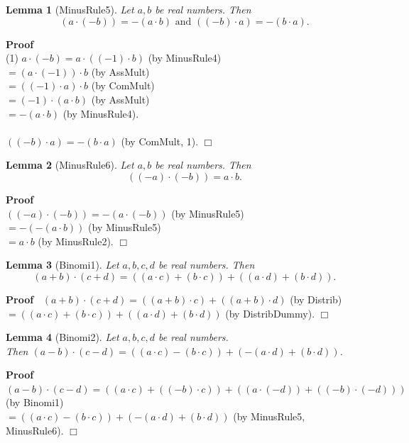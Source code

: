 \documentclass{article}
\newenvironment{forthel}{\begin{leftbar}}{\end{leftbar}}
\newenvironment{proof}{\noindent\textbf{Proof\ }}{\hspace*{\fill}$\Box$\medskip}
\newtheorem{lemma}{Lemma}
\newcommand{\dotequal}{=}
\begin{document}
\begin{forthel}
		
	\begin{lemma}[MinusRule5]
	Let $a,b$ be real numbers. 
	Then $$(a \cdot (-b)) = -(a \cdot b) \text{ and } ((-b) \cdot a) = -(b \cdot a).$$
	\end{lemma}
	\begin{proof} \\
	(1) $a \cdot (-b) \dotequal a \cdot ((-1) \cdot b)$ (by MinusRule4)
	\\$\dotequal (a \cdot (-1)) \cdot b$ (by AssMult)
	\\$\dotequal ((-1) \cdot a) \cdot b$ (by ComMult)
	\\$\dotequal (-1) \cdot (a \cdot b)$ (by AssMult)
	\\$\dotequal -(a \cdot b)$ (by MinusRule4).
	\\\\$((-b) \cdot a) \dotequal -(b \cdot a)$ (by ComMult, 1).
	\end{proof}
	
	\begin{lemma}[MinusRule6]
	Let $a,b$ be real numbers. 
	Then $$((-a) \cdot (-b)) = a \cdot b.$$
	\end{lemma}
	\begin{proof}\\
	$((-a) \cdot (-b)) \dotequal -(a \cdot (-b))$ (by MinusRule5)
	\\$\dotequal -(-(a \cdot b))$ (by MinusRule5)
	\\$\dotequal a \cdot b$ (by MinusRule2).
	\end{proof}
	
	\begin{lemma}[Binomi1]
	Let $a,b,c,d$ be real numbers.
	Then $$(a + b) \cdot (c + d) = ((a \cdot c) + (b \cdot c)) + ((a \cdot d) + (b \cdot d)).$$
	\end{lemma}
	\begin{proof}
	$(a + b) \cdot (c + d) \dotequal ((a + b) \cdot c) + ((a + b) \cdot d)$ (by Distrib)
	\\$\dotequal ((a \cdot c) + (b \cdot c)) + ((a \cdot d) + (b \cdot d))$ (by DistribDummy).
	\end{proof}
	
	\begin{lemma}[Binomi2]
	Let $a,b,c,d$ be real numbers.
	\\Then $(a - b) \cdot (c - d) = ((a \cdot c) - (b \cdot c)) + (-(a \cdot d) + (b \cdot d))$.
	\end{lemma}
	\begin{proof}
	$(a - b) \cdot (c - d) \dotequal ((a \cdot c) + ((-b) \cdot c)) + ((a \cdot (-d)) + ((-b) \cdot (-d)))$ (by Binomi1)
	\\$\dotequal ((a \cdot c) - (b \cdot c)) + (-(a \cdot d) + (b \cdot d))$ (by MinusRule5, MinusRule6).
	\end{proof}
	
\end{forthel}
\end{document}
